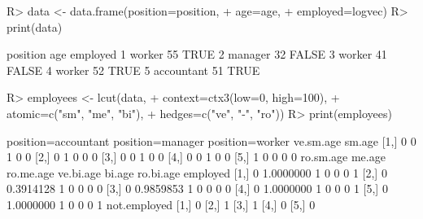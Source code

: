 \begin{Schunk}
% --begin: "lcut.data.frame"
\begin{Sinput}
R> data <- data.frame(position=position,
+                     age=age,
+                     employed=logvec)
R> print(data)
\end{Sinput}
\begin{Soutput}
    position age employed
1     worker  55     TRUE
2    manager  32    FALSE
3     worker  41    FALSE
4     worker  52     TRUE
5 accountant  51     TRUE
\end{Soutput}
\begin{Sinput}
R> employees <- lcut(data,
+       context=ctx3(low=0, high=100),
+       atomic=c("sm", "me", "bi"),
+       hedges=c("ve", "-", "ro"))
R> print(employees)
\end{Sinput}
\begin{Soutput}
     position=accountant position=manager position=worker ve.sm.age sm.age
[1,]                   0                0               1         0      0
[2,]                   0                1               0         0      0
[3,]                   0                0               1         0      0
[4,]                   0                0               1         0      0
[5,]                   1                0               0         0      0
     ro.sm.age    me.age ro.me.age ve.bi.age bi.age ro.bi.age employed
[1,]         0 1.0000000         1         0      0         0        1
[2,]         0 0.3914128         1         0      0         0        0
[3,]         0 0.9859853         1         0      0         0        0
[4,]         0 1.0000000         1         0      0         0        1
[5,]         0 1.0000000         1         0      0         0        1
     not.employed
[1,]            0
[2,]            1
[3,]            1
[4,]            0
[5,]            0
\end{Soutput}
%
% --end: "lcut.data.frame"
\end{Schunk}
